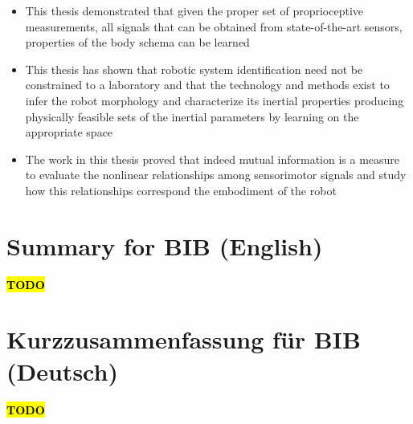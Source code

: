 \documentclass[12pt, a4paper]{article}
\newcommand{\TODO}{\hl{\textbf{TODO}}}
\begin{document}
\begin{itemize}
	\item This thesis demonstrated that given the proper set of proprioceptive measurements, all signals that can be obtained from state-of-the-art sensors, properties of the body schema can be learned
	
	\item This thesis has shown that robotic system identification need not be constrained to a laboratory and that the technology and methods exist to infer the robot morphology and characterize its inertial properties producing physically feasible sets of the inertial parameters by learning on the appropriate space
	
	\item The work in this thesis proved that indeed mutual information is a measure to evaluate the nonlinear relationships among sensorimotor signals and study how this relationships correspond the embodiment of the robot	
\end{itemize}

\section*{Summary for BIB (English)}
\TODO

\section*{Kurzzusammenfassung für BIB (Deutsch)}
\TODO
\end{document}
